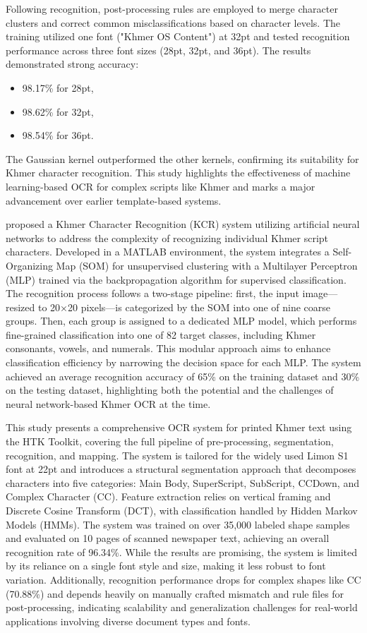 Following recognition, post-processing rules are employed to merge 
character clusters and correct common misclassifications based on 
character levels. The training utilized one font ("Khmer OS Content") 
at 32pt and tested recognition performance across three font sizes 
(28pt, 32pt, and 36pt). The results demonstrated strong accuracy:
\begin{itemize}
  \item 98.17\% for 28pt,
  \item 98.62\% for 32pt,
  \item 98.54\% for 36pt.
\end{itemize}

The Gaussian kernel outperformed the other kernels, confirming its 
suitability for Khmer character recognition. This study highlights 
the effectiveness of machine learning-based OCR for complex scripts 
like Khmer and marks a major advancement over earlier template-based 
systems.

\citet{Meng_Hann_2014} proposed a Khmer Character Recognition (KCR) 
system utilizing artificial neural networks to address the complexity 
of recognizing individual Khmer script characters. Developed in a 
MATLAB environment, the system integrates a Self-Organizing Map (SOM) 
for unsupervised clustering with a Multilayer Perceptron (MLP) 
trained via the backpropagation algorithm for supervised classification. 
The recognition process follows a two-stage pipeline: first, the input 
image—resized to 20×20 pixels—is categorized by the SOM into one of 
nine coarse groups. Then, each group is assigned to a dedicated MLP 
model, which performs fine-grained classification into one of 82 
target classes, including Khmer consonants, vowels, and numerals. 
This modular approach aims to enhance classification efficiency by 
narrowing the decision space for each MLP. The system achieved an 
average recognition accuracy of 65\% on the training dataset and 
30\% on the testing dataset, highlighting both the potential and 
the challenges of neural network-based Khmer OCR at the time.

\citet{Muaz2015} This study presents a comprehensive OCR system for 
printed Khmer text using the HTK Toolkit, covering the full 
pipeline of pre-processing, segmentation, recognition, and mapping. 
The system is tailored for the widely used Limon S1 font at 22pt and 
introduces a structural segmentation approach that decomposes 
characters into five categories: Main Body, SuperScript, SubScript, 
CCDown, and Complex Character (CC). Feature extraction relies on 
vertical framing and Discrete Cosine Transform (DCT), with 
classification handled by Hidden Markov Models (HMMs). 
The system was trained on over 35,000 labeled shape samples and 
evaluated on 10 pages of scanned newspaper text, achieving an 
overall recognition rate of 96.34\%. While the results are promising, 
the system is limited by its reliance on a single font style and size, 
making it less robust to font variation. Additionally, recognition 
performance drops for complex shapes like CC (70.88\%) and depends 
heavily on manually crafted mismatch and rule files for post-processing, 
indicating scalability and generalization challenges for real-world 
applications involving diverse document types and fonts.

